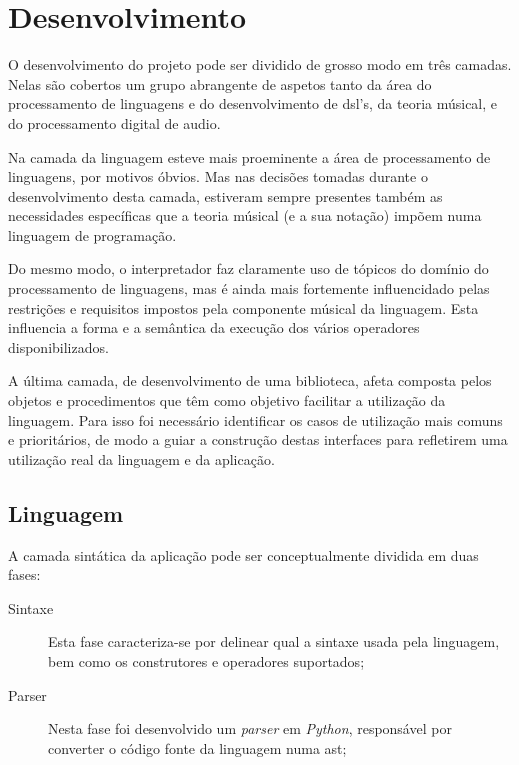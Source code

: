 \chapter{Desenvolvimento}
O desenvolvimento do projeto pode ser dividido de grosso modo em três camadas. Nelas são cobertos um grupo abrangente de aspetos tanto da área do processamento de linguagens e do desenvolvimento de \acrshort{dsl}'s, da teoria músical, e do processamento digital de audio. 

Na camada da linguagem esteve mais proeminente a área de processamento de linguagens, por motivos óbvios. Mas nas decisões tomadas durante o desenvolvimento desta camada, estiveram sempre presentes também as necessidades específicas que a teoria músical (e a sua notação) impõem numa linguagem de programação.

Do mesmo modo, o interpretador faz claramente uso de tópicos do domínio do processamento de linguagens, mas é ainda mais fortemente influencidado pelas restrições  e requisitos impostos pela componente músical da linguagem. Esta influencia a forma e a semântica da execução dos vários operadores disponibilizados.

A última camada, de desenvolvimento de uma biblioteca, afeta composta pelos objetos e procedimentos que têm como objetivo facilitar a utilização da linguagem. Para isso foi necessário identificar os casos de utilização mais comuns e prioritários, de modo a guiar a construção destas interfaces para refletirem uma utilização real da linguagem e da aplicação.

\section{Linguagem}
A camada sintática da aplicação pode ser conceptualmente dividida em duas fases:
\begin{description}
    \item[Sintaxe] Esta fase caracteriza-se por delinear qual a sintaxe usada pela linguagem, bem como os construtores e operadores suportados;
    \item[Parser] Nesta fase foi desenvolvido um \textit{parser} em \textit{Python}, responsável por converter o código fonte da linguagem numa \acrfull{ast};
\end{description}

